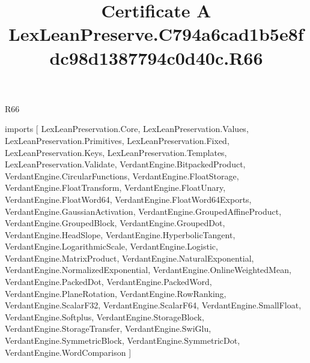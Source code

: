 \begin{lexlean}{R66}
\title{Certificate A LexLeanPreserve.C794a6cad1b5e8fdc98d1387794c0d40c.R66}
\begin{coremodule}
imports [
  LexLeanPreservation.Core,
  LexLeanPreservation.Values,
  LexLeanPreservation.Primitives,
  LexLeanPreservation.Fixed,
  LexLeanPreservation.Keys,
  LexLeanPreservation.Templates,
  LexLeanPreservation.Validate,
  VerdantEngine.BitpackedProduct,
  VerdantEngine.CircularFunctions,
  VerdantEngine.FloatStorage,
  VerdantEngine.FloatTransform,
  VerdantEngine.FloatUnary,
  VerdantEngine.FloatWord64,
  VerdantEngine.FloatWord64Exports,
  VerdantEngine.GaussianActivation,
  VerdantEngine.GroupedAffineProduct,
  VerdantEngine.GroupedBlock,
  VerdantEngine.GroupedDot,
  VerdantEngine.HeadSlope,
  VerdantEngine.HyperbolicTangent,
  VerdantEngine.LogarithmicScale,
  VerdantEngine.Logistic,
  VerdantEngine.MatrixProduct,
  VerdantEngine.NaturalExponential,
  VerdantEngine.NormalizedExponential,
  VerdantEngine.OnlineWeightedMean,
  VerdantEngine.PackedDot,
  VerdantEngine.PackedWord,
  VerdantEngine.PlaneRotation,
  VerdantEngine.RowRanking,
  VerdantEngine.ScalarF32,
  VerdantEngine.ScalarF64,
  VerdantEngine.SmallFloat,
  VerdantEngine.Softplus,
  VerdantEngine.StorageBlock,
  VerdantEngine.StorageTransfer,
  VerdantEngine.SwiGlu,
  VerdantEngine.SymmetricBlock,
  VerdantEngine.SymmetricDot,
  VerdantEngine.WordComparison
]


\end{coremodule}
\end{lexlean}
